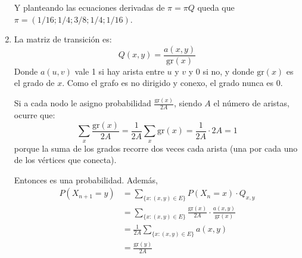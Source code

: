 \begin{enumerate}
		Y planteando las ecuaciones derivadas de $\pi = \pi Q$ queda que $\pi = (1/16; 1/4; 3/8; 1/4; 1/16)$.
		
	\item
		La matriz de transición es:
		$$Q(x,y) = \frac{a(x,y)}{\text{gr}(x)}$$
		Donde $a(u,v)$ vale 1 si hay arista entre $u$ y $v$ y 0 si no, y donde $\text{gr}(x)$ es el grado de $x$.
		Como el grafo es no dirigido y conexo, el grado nunca es 0.
		
		Si a cada nodo le asigno probabilidad $\frac{\text{gr}(x)}{2A}$, siendo $A$ el número de aristas, ocurre que:
		$$\sum_{x}\frac{\text{gr}(x)}{2A} = \frac{1}{2A} \sum_{x}\text{gr}(x) = \frac{1}{2A} \cdot 2A = 1$$
		porque la suma de los grados recorre dos veces cada arista (una por cada uno de los vértices que conecta).
		
		Entonces es una probabilidad.
		Además,
		\begin{align*}
			P(X_{n+1} = y)	& = \sum_{\{x:(x,y) \in E\}}P(X_n = x) \cdot Q_{x,y}									\\
							& = \sum_{\{x:(x,y) \in E\}}\frac{\text{gr}(x)}{2A} \cdot \frac{a(x,y)}{\text{gr}(x)}	\\
							& = \frac{1}{2A}\sum_{\{x:(x,y) \in E\}} a(x,y)											\\
							& = \frac{\text{gr}(y)}{2A}
		\end{align*}
\end{enumerate}
